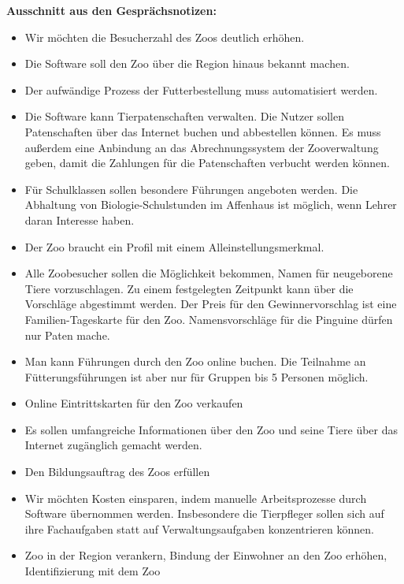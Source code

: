 \textbf{Ausschnitt aus den Gesprächsnotizen:}
\begin{itemize}[
	label={},
	leftmargin=12mm,
	]
	\item Wir möchten die Besucherzahl des Zoos deutlich erhöhen.
	\item Die Software soll den Zoo über die Region hinaus bekannt machen.
	\item Der aufwändige Prozess der Futterbestellung muss automatisiert werden.
	\item Die Software kann Tierpatenschaften verwalten. Die Nutzer sollen Patenschaften über das Internet buchen und abbestellen können. Es muss außerdem eine Anbindung an das Abrechnungssystem der Zooverwaltung geben, damit die Zahlungen für die Patenschaften verbucht werden können.
	\item Für Schulklassen sollen besondere Führungen angeboten werden. Die Abhaltung von Biologie-Schulstunden im Affenhaus ist möglich, wenn Lehrer daran Interesse haben.
	\item Der Zoo braucht ein Profil mit einem Alleinstellungsmerkmal.
	\item Alle Zoobesucher sollen die Möglichkeit bekommen, Namen für neugeborene Tiere vorzuschlagen. Zu einem festgelegten Zeitpunkt kann über die Vorschläge abgestimmt werden. Der Preis für den Gewinnervorschlag ist eine Familien-Tageskarte für den Zoo. Namensvorschläge für die Pinguine dürfen nur Paten mache.
	\item Man kann Führungen durch den Zoo online buchen. Die Teilnahme an Fütterungsführungen ist aber nur für Gruppen bis 5 Personen möglich.
	\item Online Eintrittskarten für den Zoo verkaufen
	\item Es sollen umfangreiche Informationen über den Zoo und seine Tiere über das Internet zugänglich gemacht werden.
	\item Den Bildungsauftrag des Zoos erfüllen
	\item Wir möchten Kosten einsparen, indem manuelle Arbeitsprozesse durch Software übernommen werden. Insbesondere die Tierpfleger sollen sich auf ihre Fachaufgaben statt auf Verwaltungsaufgaben konzentrieren können.
	\item Zoo in der Region verankern, Bindung der Einwohner an den Zoo erhöhen, Identifizierung mit dem Zoo

\end{itemize}
